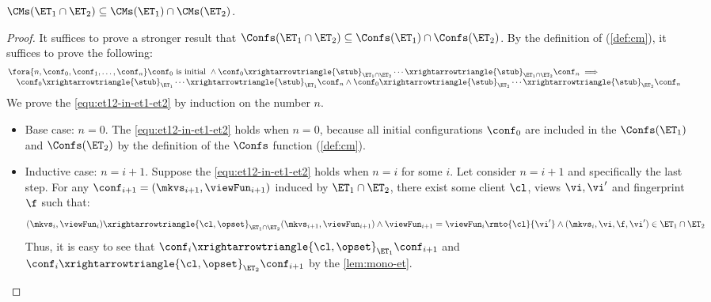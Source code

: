 \begin{lemma}
\label{lem:et12-in-et1-et2}
\( \CMs(\ET_{1} \cap \ET_{2}) \subseteq \CMs(\ET_1) \cap \CMs(\ET_2) \).
\end{lemma}
\begin{proof}
It suffices to prove a stronger result that \( \Confs(\ET_{1} \cap \ET_{2}) \subseteq \Confs(\ET_1) \cap \Confs(\ET_2) \).
By the definition of \Confs (\cref{def:cm}), it suffices to prove the following:
\begin{equation}
    \label{equ:et12-in-et1-et2}
    \begin{array}{@{}l}
    \fora{n,\conf_0, \conf_1, \dots, \conf_n} \conf_0 \text{ is initial } 
    \land \conf_0 \xrightarrowtriangle{\stub}_{\ET_1 \cap \ET_2} \cdots \xrightarrowtriangle{\stub}_{\ET_1 \cap \ET_2} \conf_n \implies {} \\
    \quad \conf_0 \xrightarrowtriangle{\stub}_{\ET_{1}} \cdots \xrightarrowtriangle{\stub}_{\ET_{1}} \conf_n \land \conf_0 \xrightarrowtriangle{\stub}_{\ET_{2}} \cdots \xrightarrowtriangle{\stub}_{\ET_{2}} \conf_n 
    \end{array}
\end{equation}
We prove the \cref{equ:et12-in-et1-et2} by induction on the number \( n \).
\begin{itemize}
\item Base case: \(n = 0\). 
The \cref{equ:et12-in-et1-et2} holds when \( n = 0 \), because all initial configurations \( \conf_0 \) are included in the \( \Confs(\ET_1)\) and \( \Confs(\ET_2) \) by the definition of the \( \Confs \) function (\cref{def:cm}).

\item Inductive case: \(n = i+1\). Suppose the \cref{equ:et12-in-et1-et2} holds when \( n = i \) for some \( i \).
Let consider \( n = i + 1 \) and specifically the last step.
For any \( \conf_{i+1} = (\mkvs_{i+1}, \viewFun_{i+1}) \) induced by \( \ET_{1} \cap \ET_2 \), 
there exist some client \( \cl \), views \( \vi, \vi' \) and fingerprint \( \f \) such that:
\[
    (\mkvs_i, \viewFun_i) \xrightarrowtriangle{\cl, \opset}_{\ET_{1} \cap \ET_{2}} (\mkvs_{i+1}, \viewFun_{i+1}) \land \viewFun_{i+1} = \viewFun_{i}\rmto{\cl}{\vi'} \land (\mkvs_i, \vi, \f, \vi' ) \in \ET_{1} \cap \ET_{2}
\]
Thus, it is easy to see that \( \conf_i \xrightarrowtriangle{\cl, \opset}_{\ET_{1}} \conf_{i+1} \) and \( \conf_i \xrightarrowtriangle{\cl, \opset}_{\ET_{2}} \conf_{i+1} \) by the \cref{lem:mono-et}.
\end{itemize}
\end{proof}

